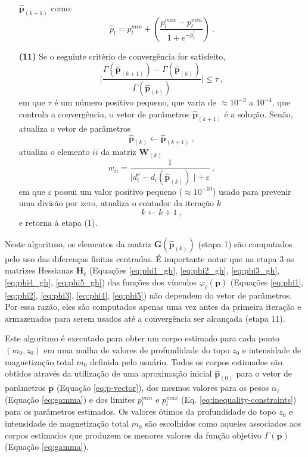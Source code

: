 \begin{itemize}
	$\hat{\mathbf{p}}_{(k+1)}$ como:
	$$
	\hat{p}_{l} = p_{l}^{min} + \left(\frac{p_{l}^{max} - p_{l}^{min}}{ 1 + e^{-\hat{p}^{\dagger}_{l}} }\right) \: .
	$$
	\item[\textbf{(11)}] Se o seguinte critério de convergência for satisfeito,
	$$
	\Bigg|
	\frac{\Gamma(\hat{\mathbf{p}}_{(k+1)}) - \Gamma(\hat{\mathbf{p}}_{(k)})}
	{\Gamma(\hat{\mathbf{p}}_{(k)})} 
	\Bigg| \le \tau \: ,
	$$ 
	em que $\tau$ é um número positivo pequeno, que varia de $\approx 10^{-3}$ a 
	$10^{-4}$, que controla a convergência, o vetor de parâmetros $\hat{\mathbf{p}}_{(k+1)}$ é a solução. 
	Senão, atualiza o vetor de parâmetros 
	$$
	\hat{\mathbf{p}}_{(k)} \leftarrow \hat{\mathbf{p}}_{(k+1)} \: ,
	$$
	atualiza o elemento $ii$ da matriz $\mathbf{W}_{(k)}$
	$$
	w_{ii} = \frac{1}{\mid d_{i}^{o} -d_{i}(\hat{\mathbf{p}}_{(k)}) \mid + 
		\, \varepsilon} \: ,
	$$
	em que $\varepsilon$ possui um valor positivo pequeno ($\approx 10^{-10}$) usado
	para prevenir uma divisão por zero, atualiza o contador da iteração $k$
	$$
	k \leftarrow k + 1 \: ,
	$$
	e retorna à etapa (1).
\end{itemize}

Neste algoritmo, os elementos da matriz $\mathbf{G}(\hat{\mathbf{p}}_{(k)})$ 
(etapa 1) são computados pelo uso das diferenças finitas centradas.
É importante notar que na etapa 3 as matrizes Hessianas $\mathbf{H}_{\ell}$ (Equações \ref{eq:phi1_gh}, \ref{eq:phi2_gh}, \ref{eq:phi3_gh}, \ref{eq:phi4_gh}, \ref{eq:phi5_gh})
das funções dos vínculos $\varphi_{\ell}(\mathbf{p})$ 
(Equações \ref{eq:phi1}, \ref{eq:phi2}, \ref{eq:phi3}, \ref{eq:phi4}, \ref{eq:phi5}) 
não dependem do vetor de parâmetros. Por essa razão, eles são computados apenas uma vez antes da primeira iteração e armazenados para serem usados até a convergência ser alcançada (etapa 11).

Este algoritmo é executado para obter um corpo estimado para cada ponto 
$(m_{0}, z_{0})$ em uma malha de valores de profundidade do topo $z_{0}$ e intensidade de magnetização total $m_{0}$ definida pelo usuário. 
Todos os corpos estimados são obtidos através da utilização de uma aproximação inicial $\hat{\mathbf{p}}_{(0)}$ para o vetor de parâmetros
$\mathbf{p}$ (Equação \ref{eq:p-vector}), dos mesmos valores para os pesos
$\alpha_{\ell}$ (Equação \ref{eq:gamma}) e dos limites $p_{l}^{min}$ e 
$p_{l}^{max}$ (Eq. \ref{eq:inequality-constraints}) para os parâmetros estimados.
Os valores ótimos da profundidade do topo $z_{0}$ e intensidade de magnetização total
$m_{0}$ são escolhidos como aqueles associados aos corpos estimados que produzem os menores valores da função objetivo $\Gamma (\mathbf{p})$ (Equação \ref{eq:gamma}).

